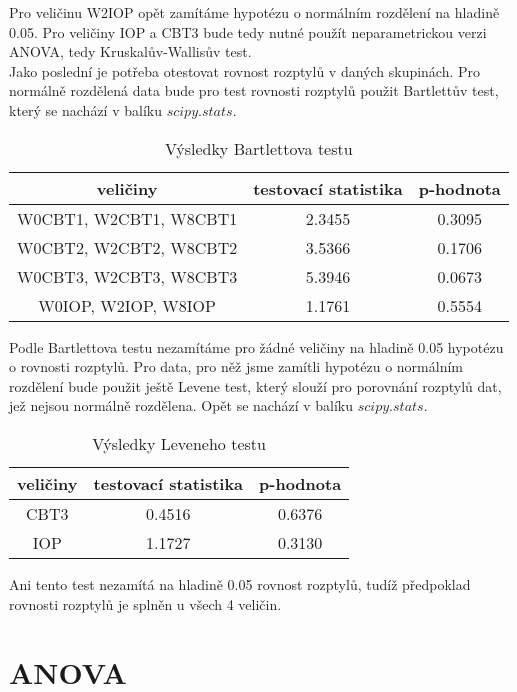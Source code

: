 \documentclass{article}
\begin{document}
Pro veličinu W2IOP opět zamítáme hypotézu o normálním rozdělení na hladině 0.05.
Pro veličiny IOP a CBT3 bude tedy nutné použít neparametrickou verzi ANOVA, tedy Kruskalův-Wallisův test.\\


Jako poslední je potřeba otestovat rovnost rozptylů v daných skupinách.
Pro normálně rozdělená data bude pro test rovnosti rozptylů použit Bartlettův test, který se nachází v balíku $scipy.stats$.

\begin{table}[H]
  \small
  \centering
  \caption{Výsledky Bartlettova testu}
  \begin{tabular}{|ccc|}
    \hline
    veličiny & testovací statistika & p-hodnota\\
    \hline
    W0CBT1, W2CBT1, W8CBT1 & 2.3455 & 0.3095\\
    W0CBT2, W2CBT2, W8CBT2 & 3.5366 & 0.1706\\
    W0CBT3, W2CBT3, W8CBT3 & 5.3946 & 0.0673\\
    W0IOP, W2IOP, W8IOP & 1.1761 & 0.5554\\
    \hline
  \end{tabular}
\end{table}

Podle Bartlettova testu nezamítáme pro žádné veličiny na hladině 0.05 hypotézu o rovnosti rozptylů.
Pro data, pro něž jsme zamítli hypotézu o normálním rozdělení bude použit ještě Levene test, který slouží pro porovnání
rozptylů dat, jež nejsou normálně rozdělena. Opět se nachází v balíku $scipy.stats$.

\begin{table}[H]
  \small
  \centering
  \caption{Výsledky Leveneho testu}
  \begin{tabular}{|ccc|}
    \hline
    veličiny & testovací statistika & p-hodnota\\
    \hline
    CBT3 & 0.4516 & 0.6376\\
    IOP & 1.1727 & 0.3130\\
    \hline
  \end{tabular}
\end{table}

Ani tento test nezamítá na hladině 0.05 rovnost rozptylů, tudíž předpoklad rovnosti rozptylů je splněn u všech 4 veličin.

\newpage

\section{ANOVA}
\end{document}
